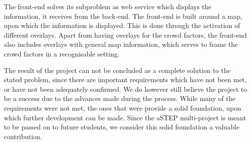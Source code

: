 
The front-end solves its subproblem as web service which displays the information, it receives from the back-end. The front-end is built around a map, upon which the information is displayed. This is done through the activation of different overlays. Apart from having overlays for the crowd factors, the front-end also includes overlays with general map information, which serves to frame the crowd factors in a recognisable setting.

The result of the project can not be concluded as a complete solution to the stated problem, since there are important requirements which have not been met, or have not been adequately confirmed. We do however still believe the project to be a success due to the advances made during the process. While many of the requirements were not met, the ones that were provide a solid foundation, upon which further development can be made. Since the aSTEP multi-project is meant to be passed on to future students, we consider this solid foundation a valuable contribution.
 
 




